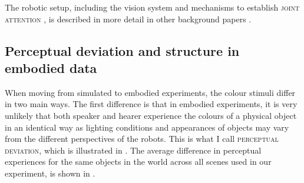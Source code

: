 The robotic setup, including the vision system and mechanisms to
establish \textsc{joint attention} \citep{tomasello95jointattention}, is
described in more detail in other background papers
\citep{spranger08diplomathesis, loetzsch10grounding}.

\subsection{Perceptual deviation and structure in embodied data}
\label{s:embodied-data}

When moving from simulated to embodied experiments, the colour stimuli
differ in two main ways. The first difference is that in embodied
experiments, it is very unlikely that both speaker and hearer
experience the colours of a physical object in an identical way as
lighting conditions and appearances of objects may vary from the
different perspectives of the robots. This is what I call
\textsc{perceptual deviation}, which is illustrated in . The average difference in perceptual
experiences for the same objects in the world across all scenes used
in our experiment, is shown in .

